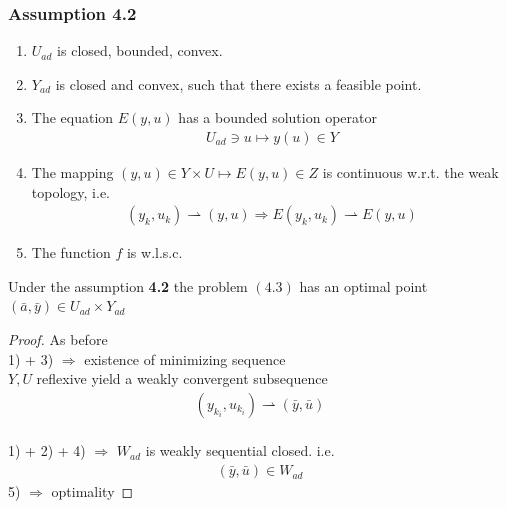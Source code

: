 \subsubsection*{Assumption 4.2}
\begin{enumerate}
	\item $U_{ad}$ is closed, bounded, convex. 
	\item $Y_{ad}$ is closed and convex, such that there exists a feasible point. 
	\item The equation $E(y, u)$ has a bounded solution operator 
		\begin{align*}
			U_{ad} \ni u \mapsto y(u) \in Y
		\end{align*}
	\item The mapping $(y, u) \in Y \times U \mapsto E(y, u) \in Z$ is continuous w.r.t. the weak topology, i.e.
		\begin{align*}
			(y_k, u_k) \rightharpoonup (y,u) \Rightarrow E(y_k, u_k) \rightharpoonup E(y, u) 
		\end{align*}
	\item The function $f$ is w.l.s.c.
\end{enumerate}

\begin{theorem}
	Under the assumption \textbf{4.2} the problem $(4. 3)$ has an optimal point $(\bar{a}, \bar{y}) \in U_{ad} \times Y_{ad}$ 
\end{theorem}
\begin{proof}
	As before\\
	1) + 3) $\Rightarrow$ existence of minimizing sequence\\
	$Y, U$ reflexive yield a weakly convergent subsequence 
	\begin{align*}
		(y_{k_i}, u_{k_i}) \rightharpoonup (\bar{y}, \bar{u})
	\end{align*}\\
	1) + 2) + 4) $\Rightarrow$ $W_{ad}$ is weakly sequential closed. i.e.
	\begin{align*}
		(\bar{y}, \bar{u}) \in W_{ad}
	\end{align*}
	5) $\Rightarrow$ optimality
\end{proof}

